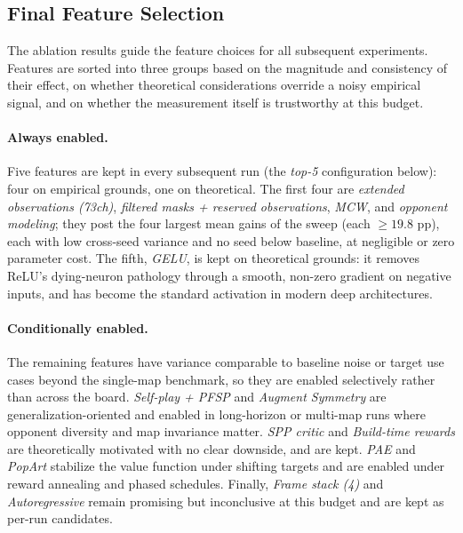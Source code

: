\subsection{Final Feature Selection}
\label{sec:feat-final-selection}

The ablation results guide the feature choices for all subsequent experiments. Features are sorted into three groups based on the magnitude and consistency of their effect, on whether theoretical considerations override a noisy empirical signal, and on whether the measurement itself is trustworthy at this budget.

\paragraph{Always enabled.}

Five features are kept in every subsequent run (the \emph{top-5} configuration below): four on empirical grounds, one on theoretical. The first four are \emph{extended observations (73ch)}, \emph{filtered masks + reserved observations}, \emph{MCW}, and \emph{opponent modeling}; they post the four largest mean gains of the sweep (each $\geq 19.8$ pp), each with low cross-seed variance and no seed below baseline, at negligible or zero parameter cost. The fifth, \emph{GELU}, is kept on theoretical grounds: it removes ReLU's dying-neuron pathology through a smooth, non-zero gradient on negative inputs, and has become the standard activation in modern deep architectures.

\paragraph{Conditionally enabled.}

The remaining features have variance comparable to baseline noise or target use cases beyond the single-map benchmark, so they are enabled selectively rather than across the board. \emph{Self-play + PFSP} and \emph{Augment Symmetry} are generalization-oriented and enabled in long-horizon or multi-map runs where opponent diversity and map invariance matter. \emph{SPP critic} and \emph{Build-time rewards} are theoretically motivated with no clear downside, and are kept. \emph{PAE} and \emph{PopArt} stabilize the value function under shifting targets and are enabled under reward annealing and phased schedules. Finally, \emph{Frame stack (4)} and \emph{Autoregressive} remain promising but inconclusive at this budget and are kept as per-run candidates.

